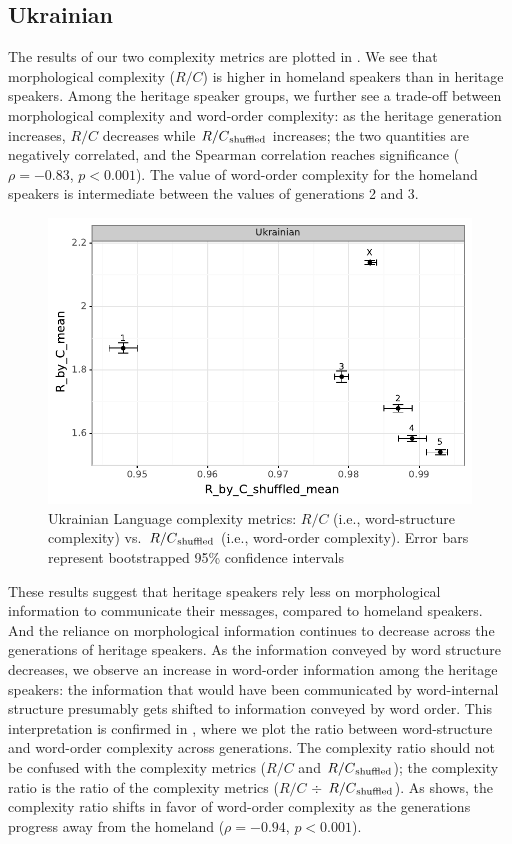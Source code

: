 \documentclass[output=paper]{langscibook}
\begin{document}
\subsection{Ukrainian}

The results of our two complexity metrics are plotted in . We see that morphological complexity ($R/C$) is higher in homeland speakers than in heritage speakers. Among the heritage speaker groups, we further see a trade-off between morphological complexity and word-order complexity: as the heritage generation increases, $R/C$ decreases while $R/C\textsubscript{shuffled}$ increases; the two quantities are negatively correlated, and the Spearman correlation reaches significance ($\rho = -0.83$, $p< 0.001$). The value of word-order complexity for the homeland speakers is intermediate between the values of generations 2 and 3. 

\begin{figure}
\includegraphics[width=\linewidth]{figures/UKR_ggplot_FW.pdf}
\caption{Ukrainian Language complexity metrics: $R/C$ (i.e., word-structure complexity) vs.~$R/C\textsubscript{shuffled}$ (i.e., word-order complexity). Error bars represent bootstrapped 95\% confidence intervals}
\label{ukr_rc}
\end{figure}

These results suggest that heritage speakers rely less on morphological information to communicate their messages, compared to homeland speakers. And the reliance on morphological information continues to decrease across the generations of heritage speakers. As the information conveyed by word structure decreases, we observe an increase in word-order information among the heritage speakers: the information that would have been communicated by word-internal structure presumably gets shifted to information conveyed by word order. This interpretation is confirmed in , where we plot the ratio between word-structure and word-order complexity across generations. The {complexity ratio} should not be confused with the {complexity metrics} ($R/C$  and $R/C\textsubscript{shuffled}$); the complexity ratio is the ratio of the complexity metrics ($R/C$ $\div$   $R/C\textsubscript{shuffled}$).  As  shows, the complexity ratio shifts in favor of word-order complexity as the generations progress away from the homeland ($\rho = -0.94$, $p< 0.001$). 
\end{document}
